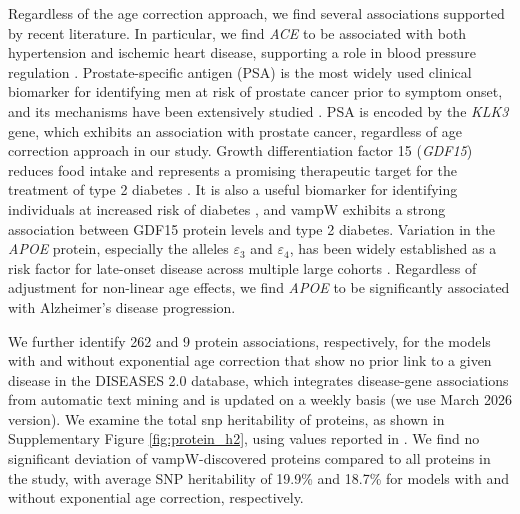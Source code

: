 Regardless of the age correction approach, we find several associations supported by recent literature. In particular, we find \emph{ACE} to be associated with both hypertension and ischemic heart disease, supporting a role in blood pressure regulation \cite{zambrano_genetic_2023}. Prostate-specific antigen (PSA) is the most widely used clinical biomarker for identifying men at risk of prostate cancer prior to symptom onset, and its mechanisms have been extensively studied \cite{pellegrino_mechanistic_2021}. PSA is encoded by the \emph{KLK3} gene, which exhibits an association with prostate cancer, regardless of age correction approach in our study. Growth differentiation factor 15 (\emph{GDF15}) reduces food intake and represents a promising therapeutic target for the treatment of type 2 diabetes \cite{aguilar-recarte_knocking_2022}. It is also a useful biomarker for identifying individuals at increased risk of diabetes \cite{aguilar-recarte_knocking_2022}, and vampW exhibits a strong association between GDF15 protein levels and type 2 diabetes. Variation in the \emph{APOE} protein, especially the alleles $\varepsilon_3$ and $\varepsilon_4$, has been widely established as a risk factor for late-onset disease across multiple large cohorts \cite{williams_proportion_2026}. Regardless of adjustment for non-linear age effects, we find \emph{APOE} to be significantly associated with Alzheimer’s disease progression. 

We further identify 262 and 9 protein associations, respectively, for the models with and without exponential age correction that show no prior link to a given disease in the DISEASES 2.0 database, which integrates disease-gene associations from automatic text mining and is updated on a weekly basis (we use March 2026 version). We examine the total \acrfull{snp} heritability of proteins, as shown in Supplementary Figure \ref{fig:protein_h2}, using values reported in \cite{sun_plasma_2023}. We find no significant deviation of vampW-discovered proteins compared to all proteins in the study, with average SNP heritability of 19.9\% and 18.7\% for models with and without exponential age correction, respectively.

